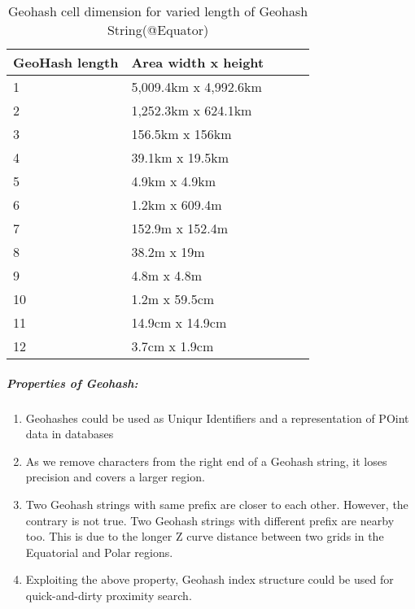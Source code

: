 \documentclass[article,type=msc,colorback,12pt,accentcolor=tud1d]{tudthesis}
\begin{document}
		   \begin{table}[h]
		   	\centering
		   	\begin{tabular}[htbp]{llllc}
		   		\\	\hline 
		   		
		   		\textbf{GeoHash length}			&\textbf{Area width x height}  \\
		   		\hline
		   		1				&5,009.4km x 4,992.6km \\
		   		2				&1,252.3km x 624.1km \\
		   		3				&156.5km x 156km \\
		   		4				&39.1km x 19.5km \\
		   		5				&4.9km x 4.9km \\
		   		6				&1.2km x 609.4m \\
		   		7				&152.9m x 152.4m \\
		   		8				&38.2m x 19m \\
		   		9				&4.8m x 4.8m \\
		   		10				&1.2m x 59.5cm \\
		   		11				&14.9cm x 14.9cm \\
		   		12				&3.7cm x 1.9cm \\
		   		
		   		\hline
		   	\end{tabular}
		   	\caption{Geohash cell dimension for varied length of Geohash String(@Equator)}
		   	\label{tab:Geohash_Resolution}
		   \end{table}
		   
		   \subparagraph{Properties of Geohash: } \cite{Geohash}
		   \begin{enumerate}
		   	\item Geohashes could be used as Uniqur Identifiers and a representation of POint data in databases \cite{wiki:geohash}
		   \item As we remove characters from the right end of a Geohash string, it loses precision and covers a larger region.
		   \item Two Geohash strings with same prefix are closer to each other. However, the contrary is not true. Two Geohash strings with different prefix are nearby too. This is due to the longer Z curve distance between two grids in the Equatorial and Polar regions.
		   		   \item Exploiting the above property, Geohash index structure could be used for quick-and-dirty proximity search.
		   
		   \end{enumerate}
		   
\end{document}
